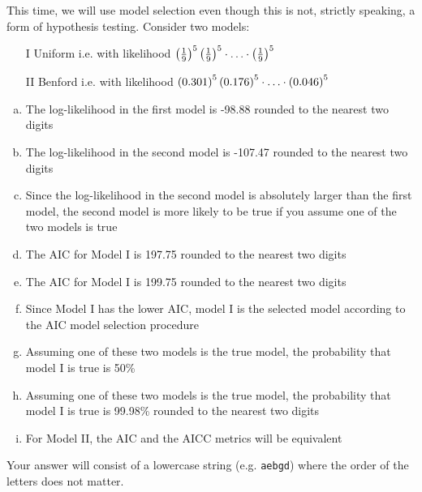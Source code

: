 \documentclass[12pt,landscape]{article}
\newcommand{\instr}{\small Your answer will consist of a lowercase string (e.g. \texttt{aebgd}) where the order of the letters does not matter. \normalsize}
\begin{document}
\vspace{-0.2cm}
\noindent {} \normalsize This time, we will use model selection even though this is not, strictly speaking, a form of hypothesis testing. Consider two models:

\begin{itemize}
\item[I] Uniform i.e. with likelihood $\left(\frac{1}{9}\right)^{5} \left(\frac{1}{9}\right)^{5} \cdot \ldots \cdot \left(\frac{1}{9}\right)^{5}$
\item[II] Benford i.e. with likelihood $\left(0.301\right)^{5} \left(0.176\right)^{5} \cdot \ldots \cdot \left(0.046\right)^{5}$
\end{itemize}

\vspace{-0.2cm}\benum{} 
\begin{enumerate}[(a)]
\item The log-likelihood in the first model is -98.88 rounded to the nearest two digits
\item The log-likelihood in the second model is -107.47 rounded to the nearest two digits
\item Since the log-likelihood in the second model is absolutely larger than the first model, the second model is more likely to be true if you assume one of the two models is true

\item The AIC for Model I is 197.75 rounded to the nearest two digits
\item The AIC for Model I is 199.75 rounded to the nearest two digits

\item Since Model I has the lower AIC, model I is the selected model according to the AIC model selection procedure

\item Assuming one of these two models is the true model, the probability that model I is true is 50\%
\item Assuming one of these two models is the true model, the probability that model I is true is 99.98\% rounded to the nearest two digits

\item For Model II, the AIC and the AICC metrics will be equivalent
\end{enumerate}
\eenum\instr\pagebreak
\end{document}
